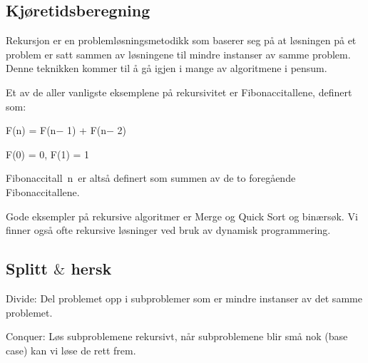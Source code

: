 \documentclass[12pt]{report}
\begin{document}


\vspace{\baselineskip}

\vspace{\baselineskip}

\vspace{\baselineskip}\subsection*{Kjøretidsberegning}
Rekursjon er en problemløsningsmetodikk som baserer seg på at løsningen på et problem er satt sammen av løsningene til mindre instanser av samme problem. Denne teknikken kommer til å gå igjen i mange av algoritmene i pensum.\par

Et av de aller vanligste eksemplene på rekursivitet er Fibonaccitallene, definert som:\par

\begin{Center}
F(n) = F(n$-$ 1) + F(n$-$ 2)
\end{Center}\par

\begin{Center}
F(0) = 0,  F(1) = 1
\end{Center}\par

\setlength{\parskip}{0.0pt}
Fibonaccitall n er altså definert som summen av de to foregående Fibonaccitallene.\par

\setlength{\parskip}{10.56pt}
Gode eksempler på rekursive algoritmer er Merge og Quick Sort og binærsøk. Vi finner også ofte rekursive løsninger ved bruk av dynamisk programmering.\par


\vspace{\baselineskip}
\subsection*{Splitt $\&$  hersk}
Divide: Del problemet opp i subproblemer som er mindre instanser av det samme problemet.\par

Conquer: Løs subproblemene rekursivt, når subproblemene blir små nok (base case) kan vi løse de rett frem. \par
\end{document}
